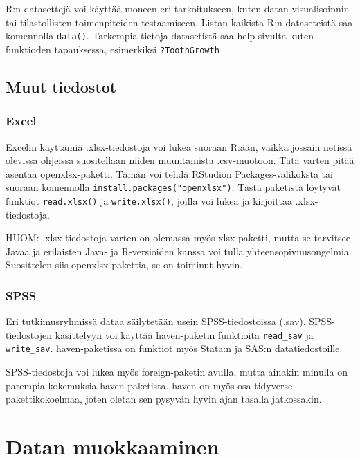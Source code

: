 \documentclass[
]{book}
\begin{document}
R:n datasettejä voi käyttää moneen eri tarkoitukseen, kuten datan visualisoinnin tai tilastollisten toimenpiteiden testaamiseen. Listan kaikista R:n dataseteistä saa komennolla \texttt{data()}. Tarkempia tietoja datasetistä saa help-sivulta kuten funktioden tapauksessa, esimerkiksi \texttt{?ToothGrowth}

\hypertarget{muut-tiedostot}{%
\section{Muut tiedostot}\label{muut-tiedostot}}

\hypertarget{excel}{%
\subsection{Excel}\label{excel}}

Excelin käyttämiä .xlsx-tiedostoja voi lukea suoraan R:ään, vaikka jossain netissä olevissa ohjeissa suositellaan niiden muuntamista .csv-muotoon. Tätä varten pitää asentaa openxlsx-paketti. Tämän voi tehdä RStudion Packages-valikoksta tai suoraan komennolla \texttt{install.packages("openxlsx")}. Tästä paketista löytyvät funktiot \texttt{read.xlsx()} ja \texttt{write.xlsx()}, joilla voi lukea ja kirjoittaa .xlsx-tiedostoja.

HUOM: .xlsx-tiedostoja varten on olemassa myös xlsx-paketti, mutta se tarvitsee Javaa ja erilaisten Java- ja R-versioiden kanssa voi tulla yhteensopivuusongelmia. Suosittelen siis openxlsx-pakettia, se on toiminut hyvin.

\hypertarget{spss}{%
\subsection{SPSS}\label{spss}}

Eri tutkimusryhmissä dataa säilytetään usein SPSS-tiedostoissa (.sav). SPSS-tiedostojen käsittelyyn voi käyttää haven-paketin funktioita \texttt{read\_sav} ja \texttt{write\_sav}. haven-paketissa on funktiot myös Stata:n ja SAS:n datatiedostoille.

SPSS-tiedostoja voi lukea myös foreign-paketin avulla, mutta ainakin minulla on parempia kokemuksia haven-paketista. haven on myös osa tidyverse-pakettikokoelmaa, joten oletan sen pysyvän hyvin ajan tasalla jatkossakin.

\hypertarget{data-wrangling}{%
\chapter{Datan muokkaaminen}\label{data-wrangling}}
\end{document}
